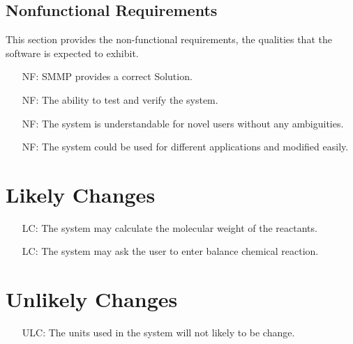 \documentclass[12pt]{article}
\newcounter{reqnum} %
\newcounter{nfreqnum} %
\newcounter{lcnum} %
\newcounter{ulcnum} %
\begin{document}
\subsection{Nonfunctional Requirements}

This section provides the non-functional requirements, the qualities that the software is
expected to exhibit.\\

\noindent \begin{itemize}
\item[NF\refstepcounter{nfreqnum}\thenfreqnum \label{Correct}:]  SMMP provides a correct Solution.\\
\item[NF\refstepcounter{nfreqnum}\thenfreqnum \label{Verify}:]  The ability to test and verify the system.\\
\item[NF\refstepcounter{nfreqnum}\thenfreqnum \label{Understandability}:]  The system is understandable for novel users without any ambiguities.\\
\item[NF\refstepcounter{nfreqnum}\thenfreqnum \label{Usability}:]  The system could be used for different applications and modified easily.\\

\end{itemize}

\section{Likely Changes}    

\noindent \begin{itemize}

\item[LC\refstepcounter{lcnum}\thelcnum\label{Molecular weight}:] The system may calculate the molecular weight of the reactants.
\item[LC\refstepcounter{lcnum}\thelcnum\label{balance}:] The system may ask the user to enter balance chemical reaction.



\end{itemize}

\section{Unlikely Changes}    

\noindent \begin{itemize}

\item[ULC\refstepcounter{ulcnum}\thelcnum\label{Units}:] The units used in the system will not likely to be change.

\end{itemize}
\end{document}
